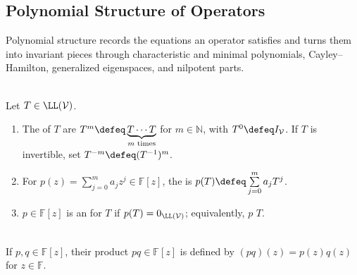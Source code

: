 \subsection{Polynomial Structure of Operators}

%

Polynomial structure records the equations an operator satisfies and turns them into invariant pieces through characteristic and minimal polynomials, Cayley--Hamilton, generalized eigenspaces, and nilpotent parts.

\begin{definition} \label{def:operator-powers} \label{def:polynomial-applied-to-operator} \label{def:annihilating-polynomial} \\
Let $T\in\LL(\mathcal{V})$.
\begin{enumerate}[label=(\roman*)]
\setlength{\itemsep}{0pt}
\item The  of $T$ are $T^m\defeq\underbrace{T\cdots T}_{m\text{ times}}$ for $m\in\mathbb{N}$, with $T^0\defeq I_{\mathcal{V}}$. If $T$ is invertible, set $T^{-m}\defeq(T^{-1})^m$.
\item For $p(z)=\sum\limits_{j=0}^{m}a_jz^j\in\mathbb{F}[z]$, the  is $p(T)\defeq\sum\limits_{j=0}^{m}a_jT^j$.
\item $p\in\mathbb{F}[z]$ is an  for $T$ if $p(T)=0_{\LL(\mathcal{V})}$; equivalently, $p$  $T$.
\end{enumerate}
\end{definition}

\begin{definition} \label{def:product-of-polynomials} \\
If $p,q\in\mathbb{F}[z]$, their product $pq\in\mathbb{F}[z]$ is defined by $(pq)(z)=p(z)q(z)$ for $z\in\mathbb{F}$.
\end{definition}

